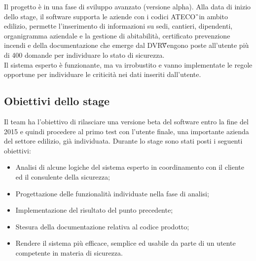 Il progetto è in una fase di sviluppo avanzato (versione alpha).
Alla data di inizio dello stage, il software supporta le aziende con i codici \gls{ATECO}\G\ in ambito edilizio, permette l’inserimento di informazioni su sedi, cantieri, dipendenti, organigramma aziendale e la gestione di abitabilità, certificato prevenzione incendi e della documentazione che emerge dal \gls{DVR}\G\.
Vengono poste all'utente più di 400 domande per individuare lo stato di sicurezza. \\ 
Il sistema esperto è funzionante, ma va irrobustito e vanno implementate le regole opportune per individuare le criticità nei dati inseriti dall’utente.


\subsection{Obiettivi dello stage}

Il team ha l’obiettivo di rilasciare una versione beta del software entro la fine del 2015 e quindi procedere al primo test con l’utente finale, una importante azienda del settore edilizio, già  individuata.
Durante lo stage sono stati posti i seguenti obiettivi:
\begin{itemize}
\item Analisi di alcune logiche del sistema esperto in coordinamento con il cliente ed il consulente della sicurezza;
\item Progettazione delle funzionalità individuate nella fase di analisi;
\item Implementazione del risultato del punto precedente;
\item Stesura della documentazione relativa al codice prodotto;
\item Rendere il sistema più efficace, semplice ed usabile da parte di un utente competente in materia di sicurezza.
\end{itemize}

